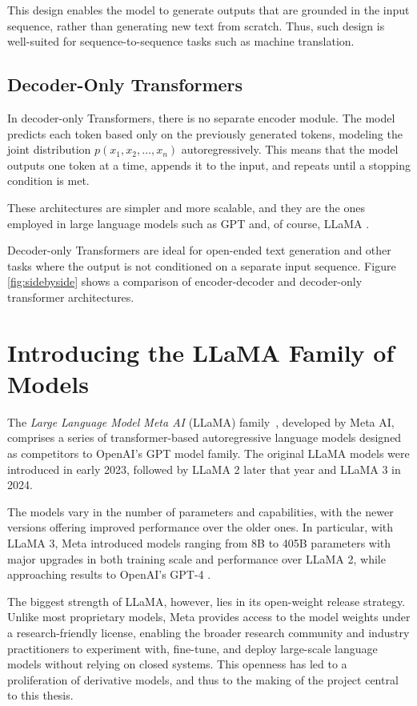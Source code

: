This design enables the model to generate outputs that are grounded in the input sequence, rather than generating new text from scratch. Thus, such design is well-suited for sequence-to-sequence tasks such as machine translation.

\subsection{Decoder-Only Transformers}

In decoder-only Transformers, there is no separate encoder module. The model predicts each token based only on the previously generated tokens, modeling the joint distribution \( p(x_1, x_2, \ldots, x_n) \) autoregressively. This means that the model outputs one token at a time, appends it to the input, and repeats until a stopping condition is met.

These architectures are simpler and more scalable, and they are the ones employed in large language models such as GPT \cite{gpt} and, of course, LLaMA \cite{llama}.

Decoder-only Transformers are ideal for open-ended text generation and other tasks where the output is not conditioned on a separate input sequence.
Figure \ref{fig:sidebyside} shows a comparison of encoder-decoder and decoder-only transformer architectures.

\section{Introducing the LLaMA Family of Models} \label{llama_overview}

The \textit{Large Language Model Meta AI} (LLaMA) family~\cite{llama}, developed by Meta AI, comprises a series of transformer-based autoregressive language models designed as competitors to OpenAI's GPT model family. The original LLaMA models were introduced in early 2023, followed by LLaMA 2 \cite{llama2} later that year and LLaMA 3 \cite{llama3} in 2024.

The models vary in the number of parameters and capabilities, with the newer versions offering improved performance over the older ones. In particular, with LLaMA 3, Meta introduced models ranging from 8B to 405B parameters with major upgrades in both training scale and performance over LLaMA 2, while approaching results to OpenAI's GPT-4 \cite{gpt4} \cite{llama3}.

The biggest strength of LLaMA, however, lies in its open-weight release strategy. Unlike most proprietary models, Meta provides access to the model weights under a research-friendly license, enabling the broader research community and industry practitioners to experiment with, fine-tune, and deploy large-scale language models without relying on closed systems. This openness has led to a proliferation of derivative models, and thus to the making of the project central to this thesis.


